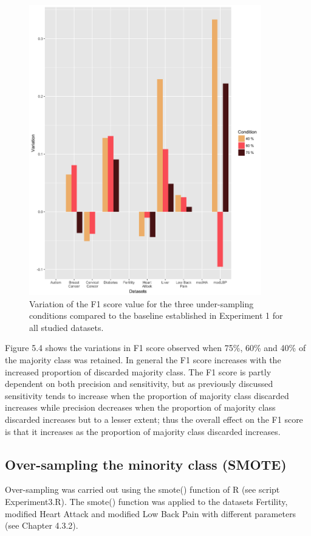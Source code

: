 \begin{figure}[!htbp]
    \centering
    \includegraphics[width=0.9\textwidth]{ThesisTemplate/usingLatex/chapter5Images/F1VariationUnderBySets.png}
    \caption{Variation of the F1 score value for the three under-sampling conditions compared to the baseline established in Experiment 1 for all studied datasets.}
    \label{fig:my_label}
\end{figure}

Figure 5.4 shows the variations in F1 score observed when 75\%, 60\% and 40\% of the majority class was retained. In general the F1 score increases with the increased proportion of discarded majority class. The F1 score is partly dependent on both precision and sensitivity, but as previously discussed sensitivity tends to increase when the proportion of majority class discarded increases while precision decreases when the proportion of majority class discarded increases but to a lesser extent; thus the overall effect on the F1 score is that it increases as the proportion of majority class discarded increases.\newline

\subsection{Over-sampling the minority class (SMOTE)}
Over-sampling was carried out using the smote() function of R (see script Experiment3.R).\newline
The smote() function was applied to the datasets Fertility, modified Heart Attack and modified Low Back Pain with different parameters (see Chapter 4.3.2). 

